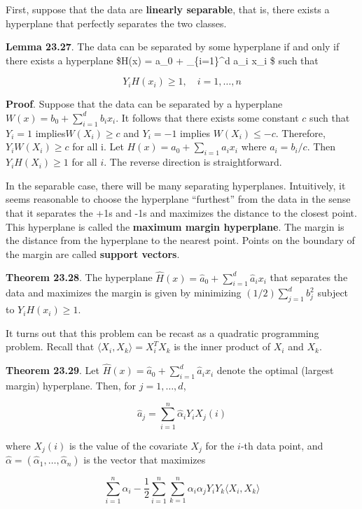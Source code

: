 First, suppose that the data are \textbf{linearly separable}, that is,
there exists a hyperplane that perfectly separates the two classes.

\textbf{Lemma 23.27}. The data can be separated by some hyperplane if
and only if there exists a hyperplane \$H(x) = a\_0 + \sum\_\{i=1\}\^{}d
a\_i x\_i \$ such that

\[ Y_i H(x_i) \geq 1, \quad i = 1, \dots, n \]

\textbf{Proof}. Suppose that the data can be separated by a hyperplane
\(W(x) = b_0 + \sum_{i=1}^d b_i x_i\). It follows that there exists some
constant \(c\) such that \(Y_i = 1\) implies\(W(X_i) \geq c\) and
\(Y_i = -1\) implies \(W(X_i) \leq -c\). Therefore,
\(Y_i W(X_i) \geq c\) for all i. Let \(H(x) = a_0 + \sum_{i=1} a_i x_i\)
where \(a_i = b_i / c\). Then \(Y_i H(X_i) \geq 1\) for all \(i\). The
reverse direction is straightforward.

In the separable case, there will be many separating hyperplanes.
Intuitively, it seems reasonable to choose the hyperplane ``furthest''
from the data in the sense that it separates the +1s and -1s and
maximizes the distance to the closest point. This hyperplane is called
the \textbf{maximum margin hyperplane}. The margin is the distance from
the hyperplane to the nearest point. Points on the boundary of the
margin are called \textbf{support vectors}.

\textbf{Theorem 23.28}. The hyperplane
\(\hat{H}(x) = \hat{a}_0 + \sum_{i=1}^d \hat{a}_i x_i\) that separates
the data and maximizes the margin is given by minimizing
\((1/2) \sum_{j=1}^d b_j^2\) subject to \(Y_i H(x_i) \geq 1\).

It turns out that this problem can be recast as a quadratic programming
problem. Recall that \(\langle X_i, X_k \rangle = X_i^T X_k\) is the
inner product of \(X_i\) and \(X_k\).

\textbf{Theorem 23.29}. Let
\(\hat{H}(x) = \hat{a}_0 + \sum_{i=1}^d \hat{a}_i x_i\) denote the
optimal (largest margin) hyperplane. Then, for \(j = 1, \dots, d\),

\[ \hat{a}_j = \sum_{i=1}^n \hat{\alpha}_i Y_i X_j(i) \]

where \(X_j(i)\) is the value of the covariate \(X_j\) for the \(i\)-th
data point, and
\(\hat{\alpha} = (\hat{\alpha}_1, \dots, \hat{\alpha}_n)\) is the vector
that maximizes

\[ \sum_{i=1}^n \alpha_i - \frac{1}{2} \sum_{i=1}^n \sum_{k=1}^n \alpha_i \alpha_j Y_i Y_k \langle X_i, X_k \rangle \]


